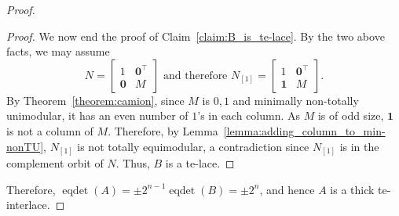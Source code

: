 \documentclass[11pt,a4paper]{amsart}
\theoremstyle{plain}
\theoremstyle{definition}
\DeclareMathOperator{\eqdet}{eqdet}
\begin{document}
\begin{proof}
\begin{proof}
We now end the proof of Claim~\ref{claim:B_is_te-lace}.
By the two above facts, we may assume
$$N = \begin{bmatrix}
	1& \mathbf{0}^\top \\\mathbf{0} & M
\end{bmatrix}  \text{ and therefore }N_{[1]} = \begin{bmatrix}
	1& \mathbf{0}^\top \\\mathbf{1} & M
\end{bmatrix}.$$
By Theorem~\ref{theorem:camion}, since $M$ is $0,\!1$ and minimally non-totally unimodular, it has an even number of $1$'s in each column. As $M$ is of odd size, $\mathbf{1}$ is not a column of $M$.
Therefore, by Lemma~\ref{lemma:adding_column_to_min-nonTU}, $N_{[1]}$ is not totally equimodular, a contradiction since $N_{[1]}$ is in the complement orbit of $N$.
Thus, $B$ is a te-lace.	
\end{proof}
Therefore, $\eqdet (A) = \pm2^{n-1}\eqdet(B) = \pm2^n$, and hence $A$ is a thick te-interlace.
\end{proof}
\end{document}
